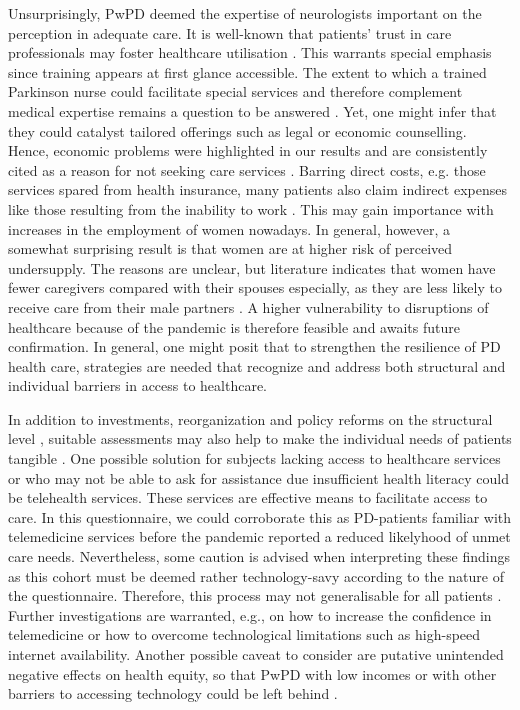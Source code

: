 \documentclass[a4paper,oneside,11pt,english]{scrartcl}
\begin{document}
Unsurprisingly, Pw\textsc{PD} deemed the expertise of neurologists important on the perception in adequate care. It is well-known that patients' trust in care professionals may foster healthcare utilisation \cite{bainbridge2009challenges, shin2016initiation}. This warrants special emphasis since training appears at first glance accessible. The extent to which a trained Parkinson nurse could facilitate special services and therefore complement medical expertise remains a question to be answered \cite{vanrole}. Yet, one might infer that they could catalyst tailored offerings such as legal or economic counselling. Hence, economic problems were highlighted in our results and are consistently cited as a reason for not seeking care services \cite{zaman2021barriers}. Barring direct costs, e.g. those services spared from health insurance, many patients also claim indirect expenses like those resulting from the inability to work \cite{spottke2005cost}. This may gain importance with increases in the employment of women nowadays.  In general, however, a somewhat surprising result is that women are at higher risk of perceived undersupply. The reasons are unclear, but literature indicates that women have fewer caregivers compared with their spouses \cite{dahodwala2018sex} especially, as they are less likely to receive care from their male partners \cite{zaman2021barriers}. A higher vulnerability to disruptions of healthcare because of the pandemic is therefore feasible and awaits future confirmation. In general, one might posit that to strengthen the resilience of \textsc{PD} health care, strategies are needed that recognize and address both structural and individual barriers in access to healthcare.

In addition to investments, reorganization and policy reforms on the structural level \cite{taylor2016leveraging, gottlieb2019social}, suitable assessments may also help to make the individual needs of patients tangible \cite{friedman2018toward, gottlieb2019social}. One possible solution for subjects lacking access to healthcare services or who may not be able to ask for assistance due insufficient health literacy could be telehealth services. These services are effective means to facilitate access to care. In this questionnaire, we could corroborate this \cite{achey2014past, van2021moving} as \textsc{PD}-patients familiar with telemedicine services before the pandemic reported a reduced likelyhood of unmet care needs. Nevertheless, some caution is advised when interpreting these findings as this cohort must be deemed rather technology-savy according to the nature of the questionnaire. Therefore, this process may not generalisable for all patients \cite{eggers2020care}. Further investigations are warranted, e.g., on how to increase the confidence in telemedicine or how to overcome technological limitations such as high-speed internet availability. Another possible caveat to consider are putative unintended negative effects on health equity, so that Pw\textsc{PD} with low incomes or with other barriers to accessing technology could be left behind \cite{samuels2021digital}. 
\end{document}
